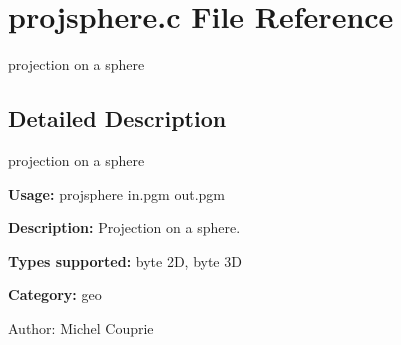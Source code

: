 \section{projsphere.c File Reference}
\label{projsphere_8c}
projection on a sphere 



\subsection{Detailed Description}
projection on a sphere 

{\bf Usage:} projsphere in.pgm out.pgm

{\bf Description:} Projection on a sphere.

{\bf Types supported:} byte 2D, byte 3D

{\bf Category:} geo

\begin{Desc}
\item[Author:]Michel Couprie \end{Desc}
